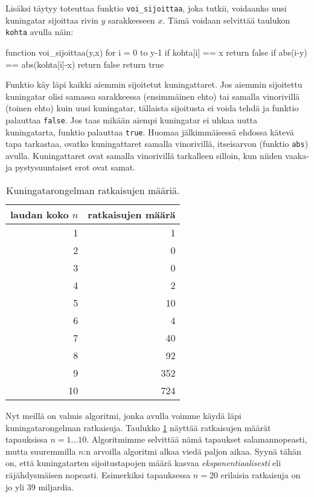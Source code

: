 Lisäksi täytyy toteuttaa funktio \texttt{voi\_sijoittaa},
joka tutkii, voidaanko uusi kuningatar sijoittaa
rivin $y$ sarakkeeseen $x$.
Tämä voidaan selvittää taulukon \texttt{kohta} avulla näin:

\begin{code}
function voi_sijoittaa(y,x)
    for i = 0 to y-1
        if kohta[i] == x
            return false
        if abs(i-y) == abs(kohta[i]-x)
            return false
    return true
\end{code}

Funktio käy läpi kaikki aiemmin sijoitetut kuningattaret.
Jos aiemmin sijoitettu kuningatar olisi samassa sarakkeessa
(ensimmäinen ehto) tai samalla vinorivillä (toinen ehto)
kuin uusi kuningatar, tällaista sijoitusta ei voida tehdä
ja funktio palauttaa \texttt{false}.
Jos taas mikään aiempi kuningatar ei uhkaa uutta kuningatarta,
funktio palauttaa \texttt{true}.
Huomaa jälkimmäisessä ehdossa kätevä tapa tarkastaa,
ovatko kuningattaret samalla vinorivillä, itseis\-arvon
(funktio \texttt{abs}) avulla.
Kuningattaret ovat samalla vinorivillä tarkalleen silloin,
kun niiden vaaka- ja pystysuuntaiset erot ovat samat.

\begin{table}
\center
\begin{tabular}{rr}
laudan koko $n$ & ratkaisujen määrä \\
\hline
1 & 1 \\
2 & 0 \\
3 & 0 \\
4 & 2 \\
5 & 10 \\
6 & 4 \\
7 & 40 \\
8 & 92 \\
9 & 352 \\
10 & 724 \\
\end{tabular}
\caption{Kuningatarongelman ratkaisujen määriä.}
\label{tab:kuning}
\end{table}

Nyt meillä on valmis algoritmi, jonka avulla voimme
käydä läpi kuningatarongelman ratkaisuja.
Taulukko \ref{tab:kuning} näyttää ratkaisujen määrät
tapauksissa $n=1 \dots 10$.
Algoritmimme selvittää nämä tapaukset salamannopeasti,
mutta suuremmilla $n$:n arvoilla algoritmi alkaa viedä paljon aikaa.
Syynä tähän on, että kuningatarten sijoitustapojen
määrä kasvaa \emph{eksponentiaalisesti}
eli räjähdysmäisen nopeasti.
Esimerkiksi tapauksessa $n=20$ erilaisia ratkaisuja on jo yli 39 miljardia.

